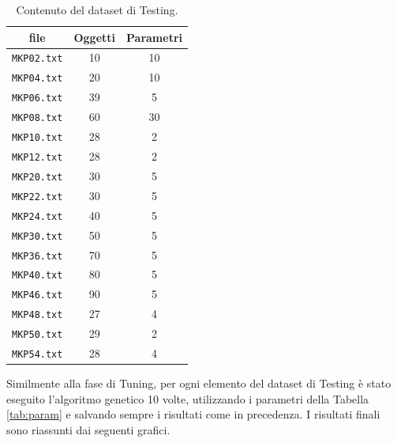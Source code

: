 \begin{table}[H]
    \centering
    \begin{tabular}{||c||c||c||}
        \textbf{file}    & \textbf{Oggetti} & \textbf{Parametri} \\
        \hline
        \verb|MKP02.txt| & 10               & 10                 \\
        \verb|MKP04.txt| & 20               & 10                 \\
        \verb|MKP06.txt| & 39               & 5                  \\
        \verb|MKP08.txt| & 60               & 30                 \\
        \verb|MKP10.txt| & 28               & 2                  \\
        \verb|MKP12.txt| & 28               & 2                  \\
        \verb|MKP20.txt| & 30               & 5                  \\
        \verb|MKP22.txt| & 30               & 5                  \\
        \verb|MKP24.txt| & 40               & 5                  \\
        \verb|MKP30.txt| & 50               & 5                  \\
        \verb|MKP36.txt| & 70               & 5                  \\
        \verb|MKP40.txt| & 80               & 5                  \\
        \verb|MKP46.txt| & 90               & 5                  \\
        \verb|MKP48.txt| & 27               & 4                  \\
        \verb|MKP50.txt| & 29               & 2                  \\
        \verb|MKP54.txt| & 28               & 4                  \\
    \end{tabular}
    \caption{Contenuto del dataset di Testing.}
\end{table}

Similmente alla fase di Tuning, per ogni elemento del dataset di Testing è stato
eseguito l'algoritmo genetico 10 volte, utilizzando i parametri della Tabella
\ref{tab:param} e salvando sempre i risultati come in precedenza.
I risultati finali sono riassunti dai seguenti grafici.


